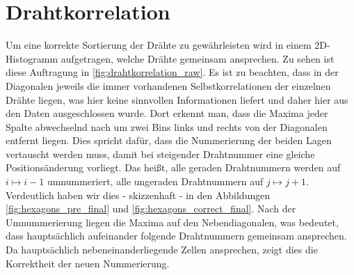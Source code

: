 
\section{Drahtkorrelation}
\label{sec:drahtkorrelation}
Um eine korrekte Sortierung der Drähte zu gewährleisten wird in einem 2D-Histogramm aufgetragen, welche Drähte gemeinsam ansprechen. Zu sehen ist diese Auftragung in \ref{fig:drahtkorrelation_raw}. Es ist zu beachten, dass in der Diagonalen jeweils die immer vorhandenen Selbstkorrelationen der einzelnen Drähte liegen, was hier keine sinnvollen Informationen liefert und daher hier aus den Daten ausgeschlossen wurde.
Dort erkennt man, dass die Maxima jeder Spalte abwechselnd nach um zwei Bins links und rechts von der Diagonalen entfernt liegen. Dies spricht dafür, dass die Nummerierung der beiden Lagen vertauscht werden muss, damit bei steigender Drahtnummer eine gleiche Positionsänderung vorliegt. Das heißt, alle geraden Drahtnummern werden auf $i\mapsto i-1$ umnummeriert, alle ungeraden Drahtnummern auf $j\mapsto j+1$. Verdeutlich haben wir dies - skizzenhaft - in den Abbildungen \ref{fig:hexagons_pre_final} und \ref{fig:hexagons_correct_final}. Nach der Umnummerierung liegen die Maxima auf den Nebendiagonalen, was bedeutet, dass hauptsächlich aufeinander folgende Drahtnummern gemeinsam ansprechen. Da hauptsächlich nebeneinanderliegende Zellen ansprechen, zeigt dies die Korrektheit der neuen Nummerierung.

